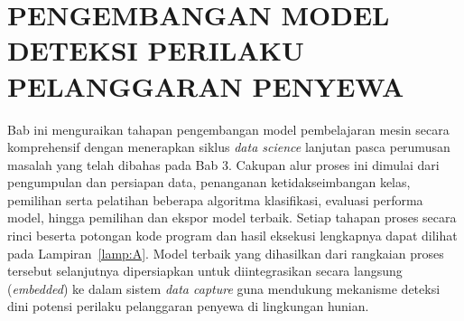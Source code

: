 \chapter{PENGEMBANGAN MODEL DETEKSI PERILAKU PELANGGARAN PENYEWA}
\label{chap:model}

Bab ini menguraikan tahapan pengembangan model pembelajaran mesin secara komprehensif dengan menerapkan siklus \textit{data science} lanjutan pasca perumusan masalah yang telah dibahas pada Bab 3. Cakupan alur proses ini dimulai dari pengumpulan dan persiapan data, penanganan ketidakseimbangan kelas, pemilihan serta pelatihan beberapa algoritma klasifikasi, evaluasi performa model, hingga pemilihan dan ekspor model terbaik. Setiap tahapan proses secara rinci beserta potongan kode program dan hasil eksekusi lengkapnya dapat dilihat pada Lampiran~\ref{lamp:A}. Model terbaik yang dihasilkan dari rangkaian proses tersebut selanjutnya dipersiapkan untuk diintegrasikan secara langsung (\textit{embedded}) ke dalam sistem \textit{data capture} guna mendukung mekanisme deteksi dini potensi perilaku pelanggaran penyewa di lingkungan hunian.





















